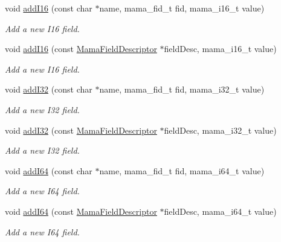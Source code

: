 \begin{DoxyCompactItemize}
void \hyperlink{classWombat_1_1MamaMsg_a92d4996b4408cab8a6851e993fcc8050}{addI16} (const char $\ast$name, mama\_\-fid\_\-t fid, mama\_\-i16\_\-t value)
\begin{DoxyCompactList}\small\item\em Add a new I16 field. \item\end{DoxyCompactList}\item 
void \hyperlink{classWombat_1_1MamaMsg_ae707d1744fadaecb47f15237f291af7c}{addI16} (const \hyperlink{classWombat_1_1MamaFieldDescriptor}{MamaFieldDescriptor} $\ast$fieldDesc, mama\_\-i16\_\-t value)
\begin{DoxyCompactList}\small\item\em Add a new I16 field. \item\end{DoxyCompactList}\item 
void \hyperlink{classWombat_1_1MamaMsg_ab95bac9d585bc609540e5f5c06ae5fcd}{addI32} (const char $\ast$name, mama\_\-fid\_\-t fid, mama\_\-i32\_\-t value)
\begin{DoxyCompactList}\small\item\em Add a new I32 field. \item\end{DoxyCompactList}\item 
void \hyperlink{classWombat_1_1MamaMsg_afe3934a1becbd328ac5d7af913648061}{addI32} (const \hyperlink{classWombat_1_1MamaFieldDescriptor}{MamaFieldDescriptor} $\ast$fieldDesc, mama\_\-i32\_\-t value)
\begin{DoxyCompactList}\small\item\em Add a new I32 field. \item\end{DoxyCompactList}\item 
void \hyperlink{classWombat_1_1MamaMsg_ad9cfb8e50a5dea9db137f9aabfc2bb7e}{addI64} (const char $\ast$name, mama\_\-fid\_\-t fid, mama\_\-i64\_\-t value)
\begin{DoxyCompactList}\small\item\em Add a new I64 field. \item\end{DoxyCompactList}\item 
void \hyperlink{classWombat_1_1MamaMsg_a358b0886b71032e7ab73f52f58b2f7cf}{addI64} (const \hyperlink{classWombat_1_1MamaFieldDescriptor}{MamaFieldDescriptor} $\ast$fieldDesc, mama\_\-i64\_\-t value)
\begin{DoxyCompactList}\small\item\em Add a new I64 field. \item\end{DoxyCompactList}\item 

\end{DoxyCompactItemize}
